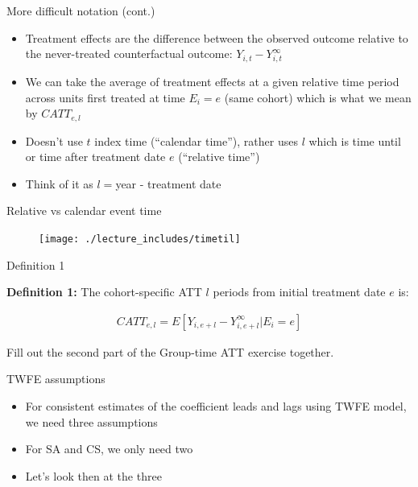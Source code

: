\documentclass{beamer}
\begin{document}
\begin{frame}{More difficult notation (cont.)}

\begin{itemize}
\item Treatment effects are the difference between the observed outcome relative to the never-treated counterfactual outcome: $Y_{i,t} - Y^{\infty}_{i,t}$
\item We can take the average of treatment effects at a given relative time period across units first treated at time $E_i=e$ (same cohort) which is what we mean by $CATT_{e,l}$
\item Doesn't use $t$ index time (``calendar time''), rather uses $l$ which is time until or time after treatment date $e$ (``relative time'')
\item Think of it as ${l}=$year - treatment date
\end{itemize}

\end{frame}

\begin{frame}{Relative vs calendar event time}


\begin{figure}
\texttt{[image: ./lecture\_includes/timetil]}
\end{figure}

\end{frame}


\begin{frame}{Definition 1}

\textbf{Definition 1:} The cohort-specific ATT $l$ periods from initial treatment date $e$ is:

\begin{eqnarray*}
CATT_{e,l} = E[Y_{i,e+l} - Y^{\infty}_{i,e+l} | E_i=e]
\end{eqnarray*}

\bigskip

Fill out the second part of the Group-time ATT exercise together.

\end{frame}

\begin{frame}{TWFE assumptions}

\begin{itemize}
\item For consistent estimates of the coefficient leads and lags using TWFE model, we need three assumptions
\item For SA and CS, we only need two
\item Let's look then at the three
\end{itemize}

\end{frame}
\end{document}
